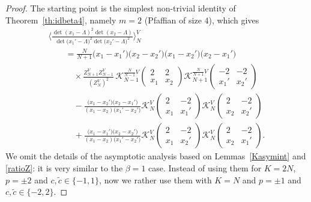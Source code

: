 \documentclass[10pt,a4paper]{amsart}
\numberwithin{equation}{section}
\begin{document}
\begin{proof}\allowdisplaybreaks
The starting point is the simplest non-trivial identity of Theorem~\ref{th:idbeta4}, namely $m = 2$ (Pfaffian of size $4$), which gives
\begin{gather*}
 \Biggl\langle\frac{\det(x_1 - \Lambda)^2\det(x_2 - \Lambda)}{\det\bigl(x_1' - \Lambda\bigr)^2\det\bigl(x_2' - \Lambda\bigr)^2}\Biggr\rangle_{N}^{V} \\
 \qquad{}= \frac{N}{N + 1}\bigl(x_1 - x_1'\bigr)\bigl(x_2 - x_2'\bigr)\bigl(x_1 - x_2'\bigr)\bigl(x_2 - x_1'\bigr) \\
 \qquad\quad{}\times  \frac{Z_{N + 1}^{V}Z_{N - 1}^{V}}{(Z_N^V)^2}\,\mathcal{K}_{N - 1}^{\frac{N}{N - 1}V}\left(\begin{matrix} 2 & 2 \\ x_1 & x_2 \end{matrix}\right)\mathcal{K}_{N + 1}^{\frac{N}{N + 1}V}\left(\begin{matrix} -2 & -2 \\ x_1' & x_2' \end{matrix}\right) \\
\qquad\quad{} - \frac{\bigl(x_1 - x_2'\bigr)\bigl(x_2 - x_1'\bigr)}{(x_1 - x_2)\bigl(x_1' - x_2'\bigr)} \mathcal{K}_{N}^{V}\left(\begin{matrix} 2 & -2 \\ x_1 & x_1' \end{matrix}\right)\mathcal{K}_{N}^{V}\left(\begin{matrix} 2 & -2 \\ x_2 & x_2' \end{matrix}\right) \\
\qquad\quad{}
 + \frac{\bigl(x_1 - x_1'\bigr)\bigl(x_2 - x_2'\bigr)}{(x_1 - x_2)\bigl(x_1' - x_2'\bigr)} \mathcal{K}_{N}^{V}\left(\begin{matrix} 2 & -2 \\ x_1 & x_2' \end{matrix}\right)\mathcal{K}_N^{V}\left(\begin{matrix} 2 & -2 \\ x_2 & x_1' \end{matrix}\right).
\end{gather*}
We omit the details of the asymptotic analysis based on Lemmas~\ref{Kasymint} and \ref{ratioZ}: it is very similar to the $\beta = 1$ case. Instead of using them for $K = 2N$, $p = \pm 2$ and $c,\tilde{c} \in \{-1,1\}$, now we rather use them with $K = N$ and $p = \pm 1$ and $c,\tilde{c} \in \{- 2,2\}$.
\end{proof}
\end{document}
